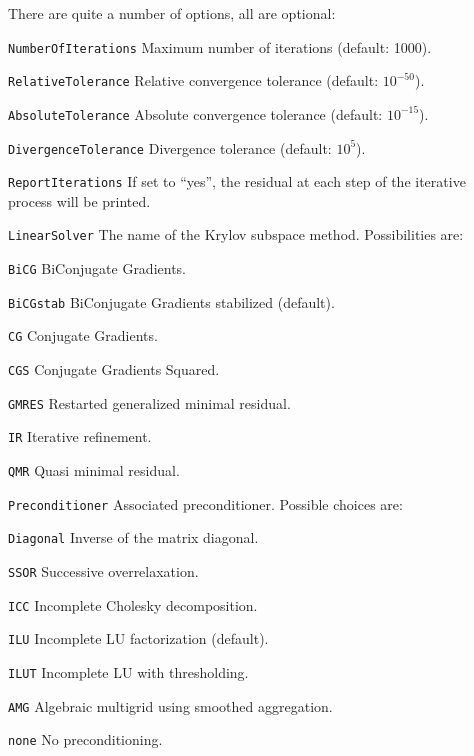 There are quite a number of options, all are optional:
\begin{list}{}{}
\item[\texttt{NumberOfIterations}] Maximum number of iterations
  (default: 1000).
\item[\texttt{RelativeTolerance}] Relative convergence tolerance
  (default: $10^{-50}$).
\item[\texttt{AbsoluteTolerance}] Absolute convergence tolerance
  (default: $10^{-15}$).
\item[\texttt{DivergenceTolerance}] Divergence tolerance (default:
  $10^{5}$).
\item[\texttt{ReportIterations}] If set to ``yes'', the residual at
  each step of the iterative process will be printed.
\item[\texttt{LinearSolver}] The name of the Krylov subspace
  method. Possibilities are:
  \begin{list}{}{}
  \item[\texttt{BiCG}] BiConjugate Gradients.
  \item[\texttt{BiCGstab}] BiConjugate Gradients stabilized (default).
  \item[\texttt{CG}] Conjugate Gradients.
  \item[\texttt{CGS}] Conjugate Gradients Squared.
  \item[\texttt{GMRES}] Restarted generalized minimal residual.
  \item[\texttt{IR}] Iterative refinement.
  \item[\texttt{QMR}] Quasi minimal residual.
  \end{list}
\item[\texttt{Preconditioner}] Associated
  preconditioner. Possible choices are:
  \begin{list}{}{}
  \item[\texttt{Diagonal}] Inverse of the matrix diagonal.
  \item[\texttt{SSOR}] Successive overrelaxation.
  \item[\texttt{ICC}] Incomplete Cholesky decomposition.
  \item[\texttt{ILU}] Incomplete LU factorization (default).
  \item[\texttt{ILUT}] Incomplete LU with thresholding.
  \item[\texttt{AMG}] Algebraic multigrid using smoothed aggregation.
  \item[\texttt{none}] No preconditioning.
  \end{list}
\end{list}

